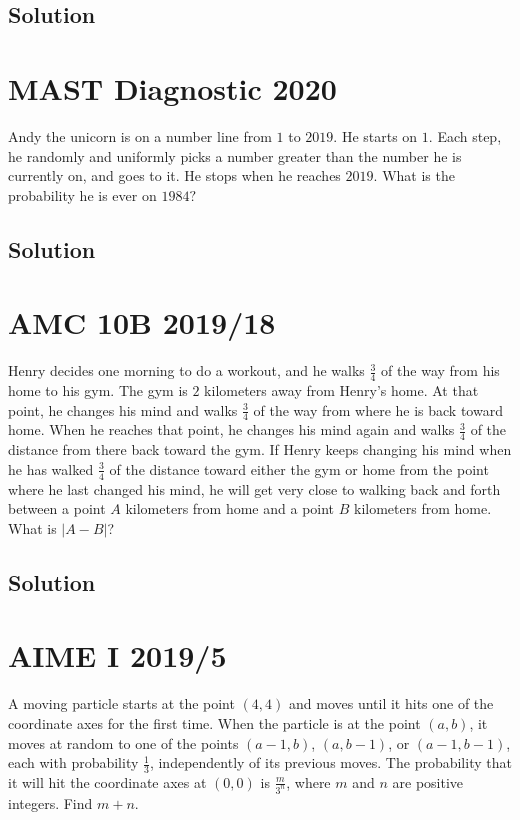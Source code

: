\documentclass[mast]{lucky}
\begin{document}
\subsection{Solution}    




\pagebreak\section{MAST Diagnostic 2020} Andy the unicorn is on a number line from $1$ to $2019.$ He starts on $1.$ Each step, he randomly and uniformly picks a number greater than the number he is currently on, and goes to it. He stops when he reaches $2019.$ What is the probability he is ever on $1984?$
\subsection{Solution}





\pagebreak\section{AMC 10B 2019/18} Henry decides one morning to do a workout, and he walks $\tfrac{3}{4}$ of the way from his home to his gym. The gym is $2$ kilometers away from Henry's home. At that point, he changes his mind and walks $\tfrac{3}{4}$ of the way from where he is back toward home. When he reaches that point, he changes his mind again and walks $\tfrac{3}{4}$ of the distance from there back toward the gym. If Henry keeps changing his mind when he has walked $\tfrac{3}{4}$ of the distance toward either the gym or home from the point where he last changed his mind, he will get very close to walking back and forth between a point $A$ kilometers from home and a point $B$ kilometers from home. What is $|A-B|$?
\subsection{Solution}    




\pagebreak\section{AIME I 2019/5} A moving particle starts at the point $(4,4)$ and moves until it hits one of the coordinate axes for the first time. When the particle is at the point $(a,b)$, it moves at random to one of the points $(a-1,b)$, $(a,b-1)$, or $(a-1,b-1)$, each with probability $\tfrac{1}{3}$, independently of its previous moves. The probability that it will hit the coordinate axes at $(0,0)$ is $\tfrac{m}{3^n}$, where $m$ and $n$ are positive integers. Find $m + n$.
\end{document}
